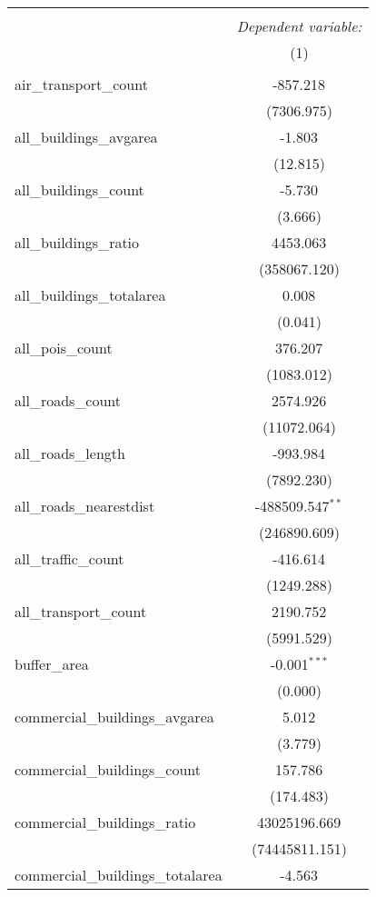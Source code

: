 \begin{table}[!htbp] \centering
\begin{tabular}{@{\extracolsep{5pt}}lc}
\\[-1.8ex]\hline
\hline \\[-1.8ex]
& \multicolumn{1}{c}{\textit{Dependent variable:}} \
\cr \cline{1-2}
\\[-1.8ex] & (1) \\
\hline \\[-1.8ex]
 air_transport_count & -857.218$^{}$ \\
  & (7306.975) \\
 all_buildings_avgarea & -1.803$^{}$ \\
  & (12.815) \\
 all_buildings_count & -5.730$^{}$ \\
  & (3.666) \\
 all_buildings_ratio & 4453.063$^{}$ \\
  & (358067.120) \\
 all_buildings_totalarea & 0.008$^{}$ \\
  & (0.041) \\
 all_pois_count & 376.207$^{}$ \\
  & (1083.012) \\
 all_roads_count & 2574.926$^{}$ \\
  & (11072.064) \\
 all_roads_length & -993.984$^{}$ \\
  & (7892.230) \\
 all_roads_nearestdist & -488509.547$^{**}$ \\
  & (246890.609) \\
 all_traffic_count & -416.614$^{}$ \\
  & (1249.288) \\
 all_transport_count & 2190.752$^{}$ \\
  & (5991.529) \\
 buffer_area & -0.001$^{***}$ \\
  & (0.000) \\
 commercial_buildings_avgarea & 5.012$^{}$ \\
  & (3.779) \\
 commercial_buildings_count & 157.786$^{}$ \\
  & (174.483) \\
 commercial_buildings_ratio & 43025196.669$^{}$ \\
  & (74445811.151) \\
 commercial_buildings_totalarea & -4.563$^{}$ \\

\end{tabular}
\end{table}
